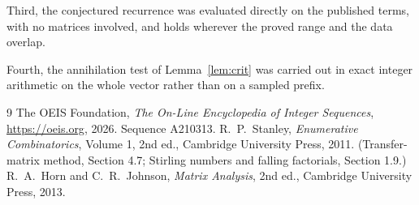 \documentclass[11pt,a4paper]{article}
\theoremstyle{plain}
\theoremstyle{definition}
\begin{document}
Third, the conjectured recurrence was evaluated directly on the published terms, with no
matrices involved, and holds wherever the proved range and the data overlap.

Fourth, the annihilation test of Lemma~\ref{lem:crit} was carried out in exact integer
arithmetic on the whole vector rather than on a sampled prefix.

\begin{thebibliography}{9}
 The OEIS Foundation, \emph{The On-Line Encyclopedia of Integer
Sequences}, \url{https://oeis.org}, 2026. Sequence A210313.
 R.~P.~Stanley, \emph{Enumerative Combinatorics}, Volume 1, 2nd ed.,
Cambridge University Press, 2011. (Transfer-matrix method, Section 4.7; Stirling numbers and
falling factorials, Section 1.9.)
 R.~A.~Horn and C.~R.~Johnson, \emph{Matrix Analysis}, 2nd ed., Cambridge
University Press, 2013.
\end{thebibliography}
\end{document}
